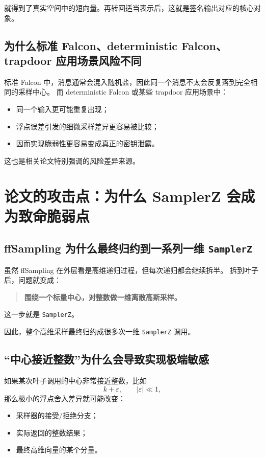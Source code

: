 \documentclass[11pt,a4paper]{ctexart}
\begin{document}
就得到了真实空间中的短向量。再转回适当表示后，这就是签名输出对应的核心对象。

\subsection{为什么标准 Falcon、deterministic Falcon、trapdoor 应用场景风险不同}

标准 Falcon 中，消息通常会混入随机盐，因此同一个消息不太会反复落到完全相同的采样中心。  
而 deterministic Falcon 或某些 trapdoor 应用场景中：

\begin{itemize}
    \item 同一个输入更可能重复出现；
    \item 浮点误差引发的细微采样差异更容易被比较；
    \item 因而实现脆弱性更容易变成真正的密钥泄露。
\end{itemize}

这也是相关论文特别强调的风险差异来源。

\section{论文的攻击点：为什么 SamplerZ 会成为致命脆弱点}

\subsection{ffSampling 为什么最终归约到一系列一维 \texttt{SamplerZ}}

虽然 ffSampling 在外层看是高维递归过程，但每次递归都会继续拆半。  
拆到叶子后，问题就变成：

\begin{quote}
\textbf{围绕一个标量中心，对整数做一维离散高斯采样。}
\end{quote}

这一步就是 \texttt{SamplerZ}。

因此，整个高维采样最终归约成很多次一维 \texttt{SamplerZ} 调用。

\subsection{“中心接近整数”为什么会导致实现极端敏感}

如果某次叶子调用的中心非常接近整数，比如
\[
k+\varepsilon,\qquad |\varepsilon|\ll 1,
\]
那么极小的浮点舍入差异就可能改变：

\begin{itemize}
    \item 采样器的接受/拒绝分支；
    \item 实际返回的整数结果；
    \item 最终高维向量的某个分量。
\end{itemize}
\end{document}
